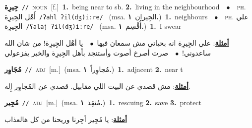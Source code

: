 \documentclass[10pt,a4paper,twoside]{article} %
\begin{document}
\begin{multicols}{2}
{\setlength\topsep{0pt}\textbf{\foreignlanguage{arabic}{جِيرِة}}\ {\color{gray}\texttt{//}\color{black}}\ \textsc{noun}\ [f.]\ \textbf{1.}~being near to sb.  \textbf{2.}~living in the neighbourhood\ \ $\bullet$\ \ \textsc{ph.} \color{gray} \foreignlanguage{arabic}{أَهْل الجِيرِة}\color{black}\ {\color{gray}\texttt{/{\sffamily ʔahl ʔil(dʒ)iːre}/}\color{black}}\ \color{gray} (msa. \foreignlanguage{arabic}{الجِيران}~\foreignlanguage{arabic}{\textbf{١.}})\color{black}\ \textbf{1.}~neighbours\ \ $\bullet$\ \ \textsc{ph.} \color{gray} \foreignlanguage{arabic}{علي الجِيرِة}\color{black}\ {\color{gray}\texttt{/{\sffamily ʕalaj ʔil(dʒ)iːre}/}\color{black}}\ \color{gray} (msa. \foreignlanguage{arabic}{أُقْسِم}~\foreignlanguage{arabic}{\textbf{١.}})\color{black}\ \textbf{1.}~I swear\  \begin{flushright}\color{gray}\foreignlanguage{arabic}{\textbf{\underline{\foreignlanguage{arabic}{أمثلة}}}: علي الجِيرِة انه بحياتي مش سمعان فيها\ $\bullet$\ \  يا أهْل الجِيرِة! من شان الله ساعدوني!\ $\bullet$\ \  صرت أصرخ أصوت وأستنجد بأهل الجِيرِة والخير يفزعولي}\end{flushright}\color{black}} \vspace{2mm}

{\setlength\topsep{0pt}\textbf{\foreignlanguage{arabic}{مُجَاوِر}}\ {\color{gray}\texttt{//}\color{black}}\ \textsc{adj}\ [m.]\ \color{gray}(msa. \foreignlanguage{arabic}{مُجاوِراً}~\foreignlanguage{arabic}{\textbf{١.}})\color{black}\ \textbf{1.}~adjacent  \textbf{2.}~near t\  \begin{flushright}\color{gray}\foreignlanguage{arabic}{\textbf{\underline{\foreignlanguage{arabic}{أمثلة}}}: مش قصدي عن البيت اللي مقابيل. قصدي عن المُجاوِر إِله.}\end{flushright}\color{black}} \vspace{2mm}

{\setlength\topsep{0pt}\textbf{\foreignlanguage{arabic}{مُجِير}}\ {\color{gray}\texttt{//}\color{black}}\ \textsc{adj}\ [m.]\ \color{gray}(msa. \foreignlanguage{arabic}{مُنقِذ}~\foreignlanguage{arabic}{\textbf{١.}})\color{black}\ \textbf{1.}~rescuing  \textbf{2.}~save  \textbf{3.}~protect\  \begin{flushright}\color{gray}\foreignlanguage{arabic}{\textbf{\underline{\foreignlanguage{arabic}{أمثلة}}}: يا مُجِير أجِرنا وريحنا من كل هالعذاب}\end{flushright}\color{black}} \vspace{2mm}


\end{multicols}
\end{document}
